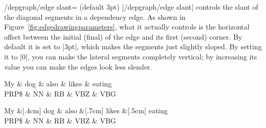 \documentclass[a4paper]{ltxdoc}
\begin{document}
\begin{key}{/depgraph/edge slant= (default 3pt)}
   |/depgraph/edge slant| controls the slant of the diagonal segments in a dependency edge. As shown in Figure~\ref{fig:edgedrawingparameters}, what it actually controls is the horizontal offset between the initial (final) of the edge and its first (second) corner. By default it is set to |3pt|, which makes the segments just slightly sloped. By setting it to |0|, you can make the lateral segments completely vertical; by increasing its value you can make the edges look less slender.
\begin{codeexample}[]
\begin{dependency}[edge slant=0] %
   \begin{deptext}[column sep=.7cm]
      My \& dog \& also \& likes \& eating \\
      PRP\$ \& NN \& RB \& VBZ \& VBG \\
   \end{deptext}
\end{dependency}
\quad
\begin{dependency}[edge slant=10pt] %
   \begin{deptext}[column sep=.3cm]
      My \&[.4cm] dog \& also \&[.7cm] likes \&[.5cm] eating \\
      PRP\$ \& NN \& RB \& VBZ \& VBG \\
   \end{deptext}
\end{dependency}
\end{codeexample}
\end{key}
\end{document}
